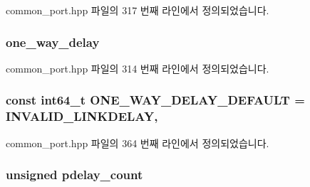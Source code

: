 common\+\_\+port.\+hpp 파일의 317 번째 라인에서 정의되었습니다.

\subsubsection[{\texorpdfstring{one\+\_\+way\+\_\+delay}{one_way_delay}}]{ one\+\_\+way\+\_\+delay\hspace{0.3cm}{\ttfamily [private]}}\hypertarget{class_common_port_ac6f52fcdc0bbe5e322f5435e494bb827}{}\label{class_common_port_ac6f52fcdc0bbe5e322f5435e494bb827}


common\+\_\+port.\+hpp 파일의 314 번째 라인에서 정의되었습니다.

\subsubsection[{\texorpdfstring{O\+N\+E\+\_\+\+W\+A\+Y\+\_\+\+D\+E\+L\+A\+Y\+\_\+\+D\+E\+F\+A\+U\+LT}{ONE_WAY_DELAY_DEFAULT}}]{\setlength{\rightskip}{0pt plus 5cm}const {\bf int64\+\_\+t} O\+N\+E\+\_\+\+W\+A\+Y\+\_\+\+D\+E\+L\+A\+Y\+\_\+\+D\+E\+F\+A\+U\+LT = {\bf I\+N\+V\+A\+L\+I\+D\+\_\+\+L\+I\+N\+K\+D\+E\+L\+AY}\hspace{0.3cm}{\ttfamily [static]}, {\ttfamily [protected]}}\hypertarget{class_common_port_a1b98444ef2ff94e8f85b04c61cf42f56}{}\label{class_common_port_a1b98444ef2ff94e8f85b04c61cf42f56}


common\+\_\+port.\+hpp 파일의 364 번째 라인에서 정의되었습니다.

\subsubsection[{\texorpdfstring{pdelay\+\_\+count}{pdelay_count}}]{\setlength{\rightskip}{0pt plus 5cm}unsigned pdelay\+\_\+count\hspace{0.3cm}{\ttfamily [private]}}\hypertarget{class_common_port_ae5740de9215d7749a564669d22ba1245}{}\label{class_common_port_ae5740de9215d7749a564669d22ba1245}


